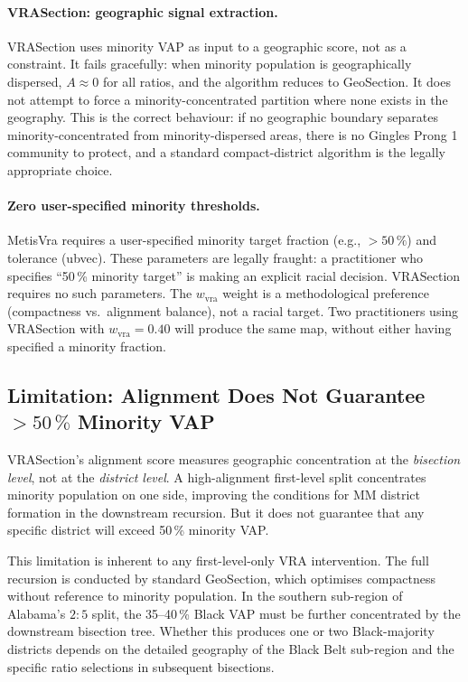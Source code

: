 \paragraph{VRASection: geographic signal extraction.}
VRASection uses minority VAP as input to a geographic score, not as a
constraint.
It fails gracefully: when minority population is geographically dispersed,
$A \approx 0$ for all ratios, and the algorithm reduces to GeoSection.
It does not attempt to force a minority-concentrated partition where none
exists in the geography.
This is the correct behaviour: if no geographic boundary separates
minority-concentrated from minority-dispersed areas, there is no
Gingles Prong 1 community to protect, and a standard compact-district
algorithm is the legally appropriate choice.

\paragraph{Zero user-specified minority thresholds.}
MetisVra requires a user-specified minority target fraction (e.g., $>50\,\%$)
and tolerance (ubvec).
These parameters are legally fraught: a practitioner who specifies
``50\,\% minority target'' is making an explicit racial decision.
VRASection requires no such parameters.
The $w_\text{vra}$ weight is a methodological preference
(compactness vs.\ alignment balance), not a racial target.
Two practitioners using VRASection with $w_\text{vra} = 0.40$ will
produce the same map, without either having specified a minority fraction.

\subsection{Limitation: Alignment Does Not Guarantee $> 50\,\%$ Minority VAP}

VRASection's alignment score measures geographic concentration at the
\emph{bisection level}, not at the \emph{district level}.
A high-alignment first-level split concentrates minority population on
one side, improving the conditions for MM district formation in the
downstream recursion.
But it does not guarantee that any specific district will exceed 50\,\%
minority VAP.

This limitation is inherent to any first-level-only VRA intervention.
The full recursion is conducted by standard GeoSection, which optimises
compactness without reference to minority population.
In the southern sub-region of Alabama's $2:5$ split, the 35--40\,\%
Black VAP must be further concentrated by the downstream bisection tree.
Whether this produces one or two Black-majority districts depends on the
detailed geography of the Black Belt sub-region and the specific ratio
selections in subsequent bisections.

